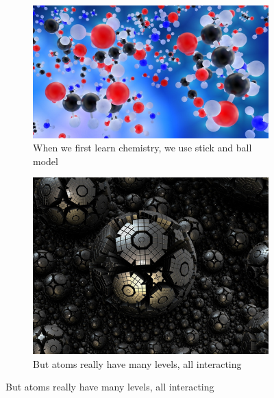 \documentclass[]{article}
\begin{document}
\begin{figure}[H]
	\caption{Chemical Complexity}\label{fig:ChemicalComplexity} 
	
	\begin{subfigure}[b]{0.45\textwidth}
		\centering
		\caption{When we first learn chemistry, we use stick and ball model}
		\includegraphics[width=\textwidth]{ChemicalComplexity}
	\end{subfigure}
	\begin{subfigure}[b]{0.45\textwidth}
		\centering
		\caption{But atoms really have many levels, all interacting}
		\includegraphics[width=\textwidth]{ChemicalComplexity1}
	\end{subfigure}
\end{figure}
\end{document}
